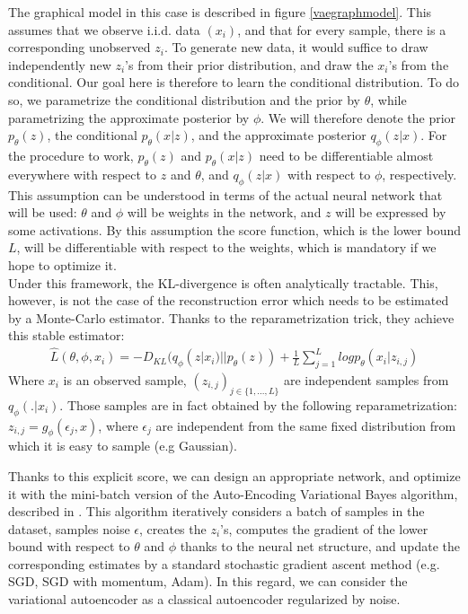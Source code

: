 \documentclass[letterpaper, twoside]{article}
\begin{document}
    The graphical model in this case is described in figure \ref{vaegraphmodel}. This assumes that we observe i.i.d. data $(x_i)$, and that for every sample, there is a corresponding unobserved $z_i$. To generate new data, it would suffice to draw independently new $z_i$'s from their prior distribution, and draw the $x_i$'s from the conditional. Our goal here is therefore to learn the conditional distribution. To do so, we parametrize the conditional distribution and the prior by $\theta$, while parametrizing the approximate posterior by $\phi$. We will therefore denote the prior $p_\theta(z)$, the conditional $p_\theta(x|z)$, and the approximate posterior $q_\phi(z|x)$. For the procedure to work, $p_\theta(z)$ and $p_\theta(x|z)$ need to be differentiable almost everywhere with respect to $z$ and $\theta$, and $q_\phi(z|x)$ with respect to $\phi$, respectively. This assumption can be understood in terms of the actual neural network that will be used: $\theta$ and $\phi$ will be weights in the network, and $z$ will be expressed by some activations. By this assumption the score function, which is the lower bound $L$, will be differentiable with respect to the weights, which is mandatory if we hope to optimize it.\\

    Under this framework, the KL-divergence is often analytically tractable. This, however, is not the case of the reconstruction error which needs to be estimated by a Monte-Carlo estimator. Thanks to the reparametrization trick, they achieve this stable estimator:\\
    \begin{align}
    \hat L(\theta, \phi, x_i) = -D_{KL}(q_\phi(z|x_i)||p_\theta(z)) + \frac{1}{L} \sum_{j=1}^L log p_\theta(x_i | z_{i, j})
    \end{align}
    Where $x_i$ is an observed sample, $(z_{i, j})_{j\in \{1, ..., L\}}$ are independent samples from $q_\phi(.|x_i)$. Those samples are in fact obtained by the following reparametrization: $z_{i, j}= g_\phi(\epsilon_j, x)$, where $\epsilon_j$ are independent from the same fixed distribution from which it is easy to sample (e.g Gaussian).

    Thanks to this explicit score, we can design an appropriate network, and optimize it with the mini-batch version of the Auto-Encoding Variational Bayes algorithm, described in \cite{Kingma.aevb}. This algorithm iteratively considers a batch of samples in the dataset, samples noise $\epsilon$, creates the $z_i$'s,  computes the gradient of the lower bound with respect to $\theta$ and $\phi$ thanks to the neural net structure, and update the corresponding estimates by a standard stochastic gradient ascent method (e.g. SGD, SGD with momentum, Adam). In this regard, we can consider the variational autoencoder as a classical autoencoder regularized by noise. \\
\end{document}
